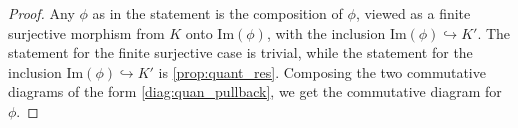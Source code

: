 \documentclass[11pt, a4paper]{amsart}
\newcommand{\C}{\mathbb{C}}
\newcommand{\g}{\mathfrak{g}}
\newcommand{\orb}{\mathbb{O}}
\newcommand{\orbk}{\orb_{K}}
\newcommand{\fk}{\mathfrak{k}}
\newcommand{\ckorb}{\check{\orb}}
\newcommand{\cF}{\mathcal{F}}
\DeclareMathOperator{\Ind}{Ind}
\DeclareMathOperator{\Coh}{Coh}
\newcommand{\cUnipOv}{\mathcal{U}nip_{\ckorb}}
\newcommand{\pr}{\operatorname{pr}}
\newcommand{\TT}{\mathscr{T}}
\newcommand{\cm}{\C^\times}
\theoremstyle{definition}
\numberwithin{equation}{section}
\begin{document}
\begin{proof}
	Any $\phi$ as in the statement is the composition of $\phi$, viewed as a finite surjective morphism from $K$ onto $\mathrm{Im}(\phi)$, with the inclusion $\mathrm{Im}(\phi) \hookrightarrow K'$. The statement for the finite surjective case is trivial, while the statement for the inclusion $\mathrm{Im}(\phi) \hookrightarrow K'$ is \cref{prop:quant_res}. Composing the two commutative diagrams of the form \eqref{diag:quan_pullback}, we get the commutative diagram for $\phi$.
\end{proof}

\end{document}
